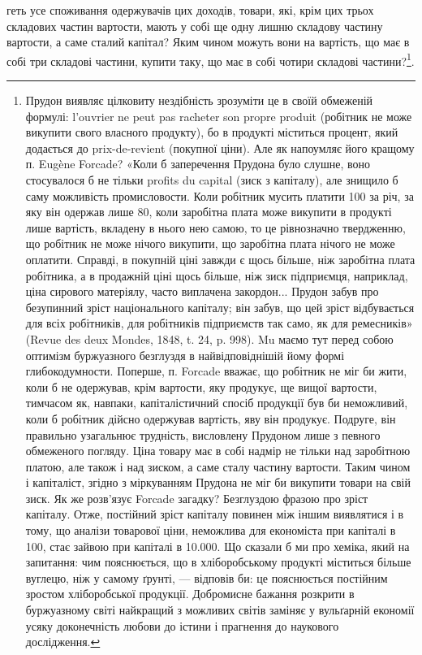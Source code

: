\parcont{}  %
геть усе споживання одержувачів цих доходів, товари, які, крім цих трьох складових
частин вартости, мають у собі ще одну лишню складову частину вартости,
а саме сталий капітал? Яким чином можуть вони на вартість, що має в
собі три складові частини, купити таку, що має в собі чотири складові частини?\footnote{
Прудон виявляє цілковиту нездібність зрозуміти це в своїй обмеженій формулі: l’ouvrier ne peut
pas racheter son propre produit (робітник не може викупити свого власного продукту), бо в продукті
міститься процент, який додається до prix-de-revient (покупної ціни). Але як напоумляє його кращому
п. Eugène Forcade? «Коли б заперечення Прудона було слушне, воно стосувалося б не тільки profits du
capital (зиск з капіталу), але знищило б саму можливість промисловости. Коли робітник мусить платити
100 за річ, за яку він одержав лише 80, коли заробітна плата може викупити в продукті лише вартість,
вкладену в нього нею самою, то це рівнозначно твердженню, що робітник не може нічого викупити, що
заробітна плата нічого не може оплатити. Справді, в покупній ціні завжди є щось більше, ніж
заробітна плата робітника, а в продажній ціні щось більше, ніж зиск підприємця, наприклад, ціна
сирового матеріялу, часто виплачена закордон... Прудон забув про безупинний зріст національного
капіталу; він забув, що цей зріст відбувається для всіх робітників, для робітників підприємств так
само, як для ремесників» (Revue des deux Mondes, 1848, t. 24, p. 998). Mu маємо тут перед собою
оптимізм буржуазного безглуздя в найвідповіднішій йому формі глибокодумности. Поперше, п. Forcade
вважає, що робітник не міг би жити, коли б не одержував, крім вартости, яку продукує, ще вищої
вартости, тимчасом як, навпаки, капіталістичний спосіб продукції був би неможливий, коли б робітник
дійсно
одержував вартість, яву він продукує. Подруге, він правильно узагальнює трудність, висловлену
Прудоном лише з певного обмеженого погляду. Ціна товару має в собі надмір не тільки над заробітною
платою, але також і над зиском, а саме сталу частину вартости. Таким чином і капіталіст, згідно з
міркуванням Прудона не міг би викупити товари на свій зиск. Як же розв’язує Forcade загадку?
Безглуздою фразою про зріст капіталу. Отже, постійний зріст капіталу повинен між іншим виявлятися і
в тому, що аналізи товарової ціни, неможлива для економіста при капіталі в 100, стає зайвою при
капіталі в 10.000. Що сказали б ми про хеміка, який на запитання: чим пояснюється, що в
хліборобському продукті міститься більше вуглецю, ніж у самому ґрунті, — відповів би: це пояснюється
постійним зростом хліборобської продукції. Добромисне бажання розкрити в буржуазному світі найкращий
з можливих світів заміняє у вульґарній економії усяку доконечність любови до істини і прагнення до
наукового дослідження.
}.

